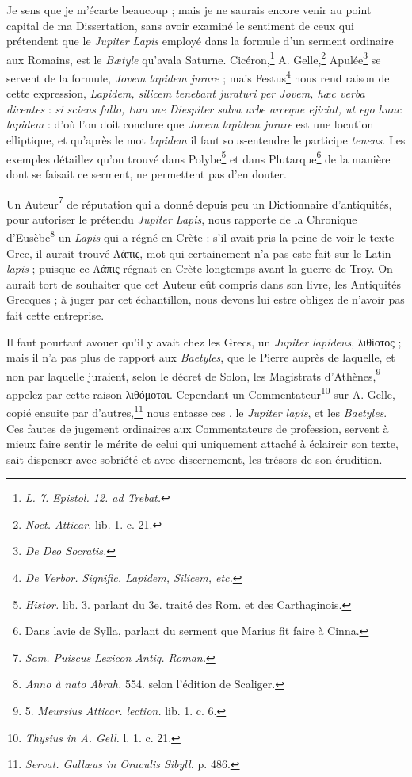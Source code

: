 \documentclass[a4paper, 11pt, oneside, polutonikogreek, french]{article}
\begin{document}
Je sens que je m'écarte beaucoup ; mais je ne saurais encore venir au point capital de ma Dissertation, sans avoir examiné le sentiment de ceux qui prétendent que le \emph{Jupiter Lapis} employé dans la formule d'un serment ordinaire aux Romains, est le \emph{Bætyle} qu'avala Saturne. Cicéron,\footnote{\emph{L. 7. Epistol. 12. ad Trebat.}} A. Gelle,\footnote{\emph{Noct. Atticar.} lib. 1. c. 21.} Apulée\footnote{\emph{De Deo Socratis.}} se servent de la formule, \emph{Jovem lapidem jurare} ; mais Festus\footnote{\emph{De Verbor. Signific. Lapidem, Silicem, etc.}} nous rend raison de cette expression, \emph{Lapidem, silicem tenebant juraturi per Jovem, hæc verba dicentes} : \emph{si sciens fallo, tum me Diespiter salva urbe arceque ejiciat, ut ego hunc lapidem} : d'où l'on doit conclure que \emph{Jovem lapidem jurare} est une locution elliptique, et qu'après le mot \emph{lapidem} il faut sous-entendre le participe \emph{tenens}. Les exemples détaillez qu'on trouvé dans Polybe\footnote{\emph{Histor.} lib. 3. parlant du 3e. traité des Rom. et des Carthaginois.} et dans Plutarque\footnote{Dans lavie de Sylla, parlant du serment que Marius fit faire à Cinna.} de la manière dont se faisait ce serment, ne permettent pas d'en douter.

Un Auteur\footnote{\emph{Sam. Puiscus Lexicon Antiq. Roman.}} de réputation qui a donné depuis peu un Dictionnaire d'antiquités, pour autoriser le prétendu \emph{Jupiter Lapis}, nous rapporte de la Chronique d'Eusèbe\footnote{\emph{Anno à nato Abrah.} 554. selon l'édition de Scaliger.} un \emph{Lapis} qui a régné en Crète : s'il avait pris la peine de voir le texte Grec, il aurait trouvé Λάπις, mot qui certainement n'a pas este fait sur le Latin \emph{lapis} ; puisque ce Λάπις régnait en Crète longtemps avant la guerre de Troy. On aurait tort de souhaiter que cet Auteur eût compris dans son livre, les Antiquités Grecques ; à juger par cet échantillon, nous devons lui estre obligez de n'avoir pas fait cette entreprise.

Il faut pourtant avouer qu'il y avait chez les Grecs, un \emph{Jupiter lapideus}, λιθίοτος ; mais il n'a pas plus de rapport aux \emph{Baetyles}, que le Pierre auprès de laquelle, et non par laquelle juraient, selon le décret de Solon, les Magistrats d'Athènes,\footnote{5. \emph{Meursius Atticar. lection.} lib. 1. c. 6.} appelez par cette raison λιθόμοται. Cependant un Commentateur\footnote{\emph{Thysius in A. Gell.} l. 1. c. 21.} sur A. Gelle, copié ensuite par d'autres,\footnote{\emph{Servat. Gallæus in Oraculis Sibyll.} p. 486.} nous entasse ces , le \emph{Jupiter lapis}, et les \emph{Baetyles}. Ces fautes de jugement ordinaires aux Commentateurs de profession, servent à mieux faire sentir le mérite de celui qui uniquement attaché à éclaircir son texte, sait dispenser avec sobriété et avec discernement, les trésors de son érudition.
\end{document}
